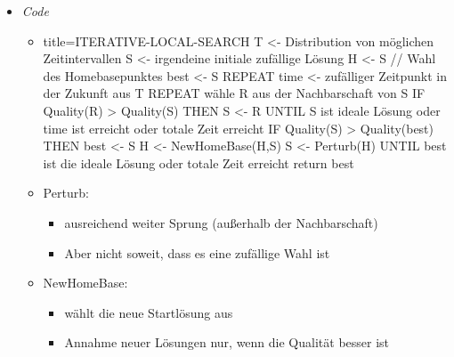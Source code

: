 \documentclass[
    12pt,
    a4paper,
    ngerman,
    color=3b,%
    marginpar=false,
    colorback=false,
    leqno,
]{tudaexercise}
\begin{document}
\begin{itemize}
\begin{itemize}
                \item \textit{Code}
                    \begin{itemize}
                        \item[]
                            \begin{ccode}[autogobble,fontsize=\small]{title={ITERATIVE-LOCAL-SEARCH}}
                            T <- Distribution von möglichen Zeitintervallen
                            S <- irgendeine initiale zufällige Lösung
                            H <- S      // Wahl des Homebasepunktes
                            best <- S
                            REPEAT
                                time <- zufälliger Zeitpunkt in der Zukunft aus T
                                REPEAT
                                    wähle R aus der Nachbarschaft von S
                                    IF Quality(R) > Quality(S) THEN
                                        S <- R
                                UNTIL S ist ideale Lösung oder time ist erreicht oder totale Zeit erreicht
                                IF Quality(S) > Quality(best) THEN
                                    best <- S
                                H <- NewHomeBase(H,S)
                                S <- Perturb(H)
                            UNTIL best ist die ideale Lösung oder totale Zeit erreicht
                            return best
                            \end{ccode}
                        \item Perturb:
                            \begin{itemize}
                                \item ausreichend weiter Sprung (außerhalb der Nachbarschaft)
                                \item Aber nicht soweit, dass es eine zufällige Wahl ist
                            \end{itemize}
                        \item NewHomeBase:
                            \begin{itemize}
                                \item wählt die neue Startlösung aus
                                \item Annahme neuer Lösungen nur, wenn die Qualität besser ist
                            \end{itemize}
                    \end{itemize}
            \end{itemize}


\end{itemize}
\end{document}
